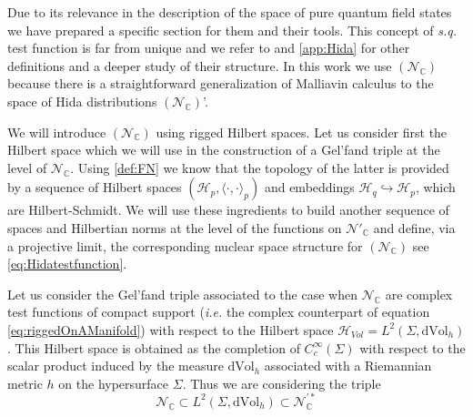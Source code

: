 \documentclass{elsarticle}%
\begin{document}
    Due to its relevance in the description of the space of pure quantum field states we have prepared a specific section for them and their tools. This concept of \textit{s.q.} test function is far from unique and we refer to \cite{hidaWhiteNoise1993} and \ref{app:Hida} for other definitions and a deeper study of their structure. In this work we use $(\mathcal{N}_{\mathbb{C}})$ because there is a straightforward generalization of Malliavin calculus to the space of Hida distributions $(\mathcal{N}_{\mathbb{C}})$'.


We will introduce $(\mathcal{N}_{\mathbb{C}})$ using rigged Hilbert spaces. Let us consider first the Hilbert space which we will use in the construction of a Gel'fand triple at the level of $\mathcal{N}_{\mathbb{C}}$. Using \autoref{def:FN} we know that the topology of the latter is provided by a sequence of Hilbert spaces $(\mathcal{H}_p, \langle \cdot, \cdot \rangle_p)$ and embeddings $\mathcal{H}_q\hookrightarrow \mathcal{H}_p$, which are Hilbert-Schmidt. We will use these ingredients to build another sequence of spaces and Hilbertian norms at the level of the functions on $\mathcal{N}'_{\mathbb{C}}$ and define, via a projective limit, the corresponding nuclear space structure for $(\mathcal{N}_{\mathbb{C}})$ see \eqref{eq:Hidatestfunction}.





 Let us consider the Gel'fand triple associated to the case when $\mathcal{N}_{\mathbb{C}}$ are complex test functions of compact support ({\it i.e.} the complex counterpart of equation \eqref{eq:riggedOnAManifold}) with respect to the Hilbert space $\mathcal{H}_{Vol}=L^2(\Sigma,\mathrm{dVol}_h)$. This Hilbert space is  obtained as the completion of $C^\infty_c(\Sigma)$ with respect to the scalar product induced by the measure $\mathrm{dVol}_h$ associated with a Riemannian metric $h$ on the hypersurface $\Sigma$. Thus we are considering the triple 
\begin{equation}
    \label{eq:riggedOnAManifoldcomp}
    \mathcal{N}_{\mathbb{C}}\subset L^2(\Sigma,\mathrm{dVol}_h) \subset \mathcal{N}_{\mathbb{C}}^{\prime*}
    \end{equation}
\end{document}
